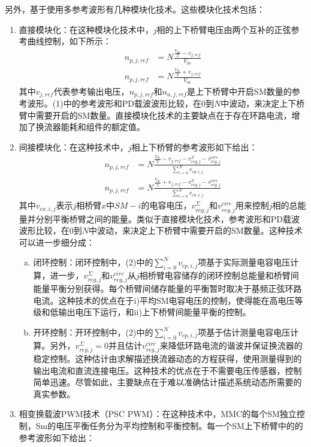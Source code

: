   另外，基于使用多参考波形有几种模块化技术。这些模块化技术包括：
  \begin{enumerate}[1)]
  \item 直接模块化：在这种模块化技术中，$j$相的上下桥臂电压由两个互补的正弦参考曲线控制，如下所示：
\begin{align*}
n_{p,j,ref} &= N\frac{\frac{V_{dc}}{2}-v_{j,ref}}{V_{dc}}\tag{1a}\\
n_{p,j,ref} &= N\frac{\frac{V_{dc}}{2}+v_{j,ref}}{V_{dc}}\tag{1b}
\end{align*}
  其中$v_{j,ref}$代表参考输出电压，$n_{p,j,ref}$和$n_{n,j,ref}$是上下桥臂中开启SM数量的参考波形。(1)中的参考波形和PD载波波形比较，在$0$到$N$中波动，来决定上下桥臂中需要开启的SM数量。直接模块化技术的主要缺点在于存在环路电流，增加了换流器能耗和组件的额定值。
  \item 间接模块化：在这种技术中，$j$相上下桥臂的参考波形如下给出：
\begin{align*}
n_{p,j,ref} &= N\frac{\frac{V_{dc}}{2}-v_{j,ref}-v_{reg,j}^\Sigma-v_{reg,j}^{circ}}{\sum^N_{i=0}v_{cp,i,j}}\tag{2a}\\
n_{p,j,ref} &= N\frac{\frac{V_{dc}}{2}+v_{j,ref}-v_{reg,j}^\Sigma-v_{reg,j}^{circ}}{\sum^N_{i=0}v_{cn,i,j}}\tag{2b}
\end{align*}
  其中$v_{cx,i,j}$表示$j$相桥臂$x$中$SM-i$的电容电压，$v_{reg,j}^\Sigma$和$v_{reg,j}^{circ}$用来控制$j$相的总能量并分别平衡桥臂之间的能量。类似于直接模块化技术，参考波形和PD载波波形比较，在$0$到$N$中波动，来决定上下桥臂中需要开启的SM数量。这种技术可以进一步细分成：
  \begin{enumerate}[a)]
  \item 闭环控制：闭环控制中，(2)中的$\sum^N_{i=0}v_{cp,i,j}$项基于实际测量电容电压计算，进一步，$v_{reg,j}^\Sigma$和$v_{reg,j}^{circ}$从$j$相桥臂电容储存的闭环控制总能量和桥臂间能量平衡分别获得。每个桥臂间储存能量的平衡暂时取决于基频正弦环路电流。这种技术的优点在于i)平均SM电容电压的控制，使得能在高电压等级和低输出电压下运行，和ii)上下桥臂间能量平衡的控制。
  \item 开环控制：开环控制中，(2)中的$\sum^N_{i=0}v_{cp,i,j}$项基于估计测量电容电压计算。另外，$v_{reg,j}^\Sigma=0$并且估计$v_{reg,j}^{circ}$来降低环路电流的谐波并保证换流器的稳定控制。这种估计由求解描述换流器动态的方程获得，使用测量得到的输出电流和直流连接电压。这种技术的优点在于不需要电压传感器，控制简单迅速。尽管如此，主要缺点在于难以准确估计描述系统动态所需要的真实参数。
  \end{enumerate}
  \item 相变换载波PWM技术（PSC PWM）：在这种技术中，MMC的每个SM独立控制，Sm的电压平衡任务分为平均控制和平衡控制。每一个SM上下桥臂中的的参考波形如下给出：

\end{enumerate}
